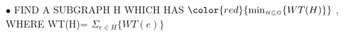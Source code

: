 \documentclass[preview]{standalone}
\begin{document}
\begin{center}
$\bullet$ FIND   A   SUBGRAPH   H  WHICH   HAS {$\color{red}{ \min_{\scriptscriptstyle H \subseteq G} \{ WT(H) \}}$} ,  WHERE   WT(H)= $\Sigma_{e \in H} \{ WT(e) \}$
\end{center}
\end{document}
